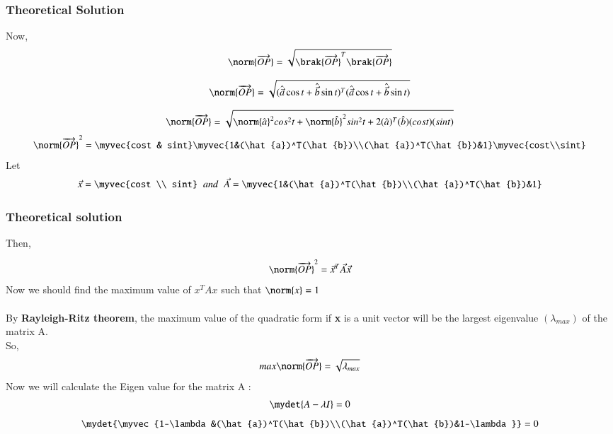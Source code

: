 \documentclass{beamer}
\begin{document}
\begin{frame}
\frametitle{Theoretical Solution}
Now,
\begin{align}
    \norm{\overrightarrow{OP}}=\sqrt{\brak{\overrightarrow{OP}}^T\brak{\overrightarrow{OP}}}
\end{align}

\begin{align}
    \norm{\overrightarrow{OP}}=\sqrt{(\hat{\vec{a}}\cos{t} + \hat{\vec{b}}\sin{t})^T(\hat{\vec{a}}\cos{t} + \hat{\vec{b}}\sin{t})}
\end{align}

\begin{align}
   \norm{\overrightarrow{OP}}=\sqrt{\norm{\hat{a}}^2cos^2t+ \norm{\hat{b}}^2sin^2t+2(\hat{a})^T(\hat{b})(cost)(sint)}
\end{align}
\begin{align}
       \norm{\overrightarrow{OP}}^2=\myvec{cost & sint}\myvec{1&(\hat{a})^T(\hat{b})\\(\hat{a})^T(\hat{b})&1}\myvec{cost\\sint}
\end{align}
Let
\begin{align}
    \Vec{x}= \myvec{cost \\ sint} \;\;and\;\;\vec{A}=\myvec{1&(\hat{a})^T(\hat{b})\\(\hat{a})^T(\hat{b})&1}
\end{align}


\end{frame}
\begin{frame}
\frametitle{Theoretical solution}
Then, 

\begin{align}
\norm{\overrightarrow{OP}}^2=\Vec{x}^T\vec{A}\Vec{x}
  \end{align}
Now we should find the maximum value of \textbf{$x^TAx$} such that $\norm{x}=1$\\\\
By \textbf{Rayleigh-Ritz theorem}, the maximum value of the quadratic form if \textbf{x} is a unit vector will be the largest eigenvalue $(\lambda_{max})$ of the matrix A.\\
So,
\begin{align}
    max\norm{\overrightarrow{OP}}=\sqrt{\lambda_{max}}
\end{align}
Now we will calculate the Eigen value for the matrix A :
\begin{align}
    \mydet{A-\lambda I}=0
\end{align}
\begin{align}
    \mydet{\myvec{1-\lambda&(\hat{a})^T(\hat{b})\\(\hat{a})^T(\hat{b})&1-\lambda}}=0
\end{align}


\end{frame}
\end{document}
